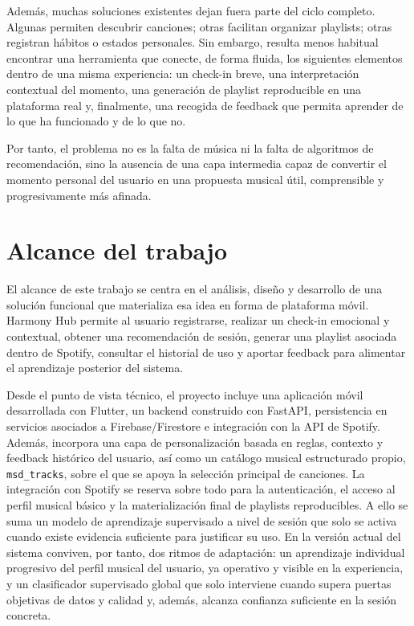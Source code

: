 Además, muchas soluciones existentes dejan fuera parte del ciclo completo. Algunas permiten descubrir canciones; otras facilitan organizar playlists; otras registran hábitos o estados personales. Sin embargo, resulta menos habitual encontrar una herramienta que conecte, de forma fluida, los siguientes elementos dentro de una misma experiencia: un check-in breve, una interpretación contextual del momento, una generación de playlist reproducible en una plataforma real y, finalmente, una recogida de feedback que permita aprender de lo que ha funcionado y de lo que no.

Por tanto, el problema no es la falta de música ni la falta de algoritmos de recomendación, sino la ausencia de una capa intermedia capaz de convertir el momento personal del usuario en una propuesta musical útil, comprensible y progresivamente más afinada.

\section{Alcance del trabajo}
\label{sec:alcance}

El alcance de este trabajo se centra en el análisis, diseño y desarrollo de una solución funcional que materializa esa idea en forma de plataforma móvil. Harmony Hub permite al usuario registrarse, realizar un check-in emocional y contextual, obtener una recomendación de sesión, generar una playlist asociada dentro de Spotify, consultar el historial de uso y aportar feedback para alimentar el aprendizaje posterior del sistema.

Desde el punto de vista técnico, el proyecto incluye una aplicación móvil desarrollada con Flutter, un backend construido con FastAPI, persistencia en servicios asociados a Firebase/Firestore e integración con la API de Spotify. Además, incorpora una capa de personalización basada en reglas, contexto y feedback histórico del usuario, así como un catálogo musical estructurado propio, \texttt{msd\_tracks}, sobre el que se apoya la selección principal de canciones. La integración con Spotify se reserva sobre todo para la autenticación, el acceso al perfil musical básico y la materialización final de playlists reproducibles. A ello se suma un modelo de aprendizaje supervisado a nivel de sesión que solo se activa cuando existe evidencia suficiente para justificar su uso. En la versión actual del sistema conviven, por tanto, dos ritmos de adaptación: un aprendizaje individual progresivo del perfil musical del usuario, ya operativo y visible en la experiencia, y un clasificador supervisado global que solo interviene cuando supera puertas objetivas de datos y calidad y, además, alcanza confianza suficiente en la sesión concreta.

